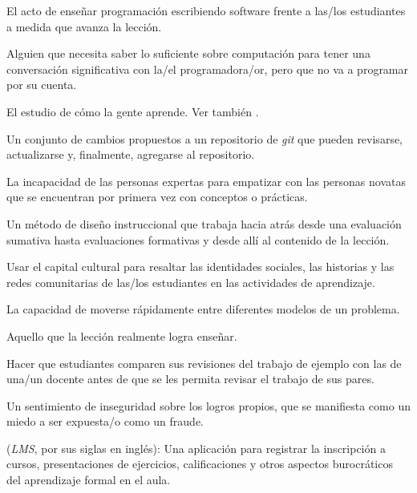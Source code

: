 \begin{description}
 El acto de enseñar programación
escribiendo software frente a las/los estudiantes a medida que avanza la lección.

 Alguien que necesita saber lo suficiente sobre 
computación para tener una conversación significativa con la/el programadora/or, pero que no va a programar por su cuenta.

 El estudio de cómo
la gente aprende. Ver también .

 Un conjunto de cambios propuestos a un repositorio de
\emph{git} que pueden revisarse, actualizarse y, finalmente, agregarse al repositorio.

 La incapacidad de las personas expertas
para empatizar con las personas novatas que se encuentran por primera
vez con conceptos o prácticas.

 Un método de diseño instruccional que
trabaja hacia atrás desde una evaluación sumativa hasta evaluaciones formativas y desde allí al contenido de la lección.

 Usar el capital cultural
para resaltar las identidades sociales, las historias y las redes comunitarias de
las/los estudiantes en las actividades de aprendizaje.

 La capacidad de moverse
rápidamente entre diferentes modelos de un problema.

 Aquello que la lección realmente logra enseñar.

 Hacer que estudiantes comparen sus
revisiones del trabajo de ejemplo con las de una/un docente antes de que
se les permita revisar el trabajo de sus pares.

 Un sentimiento de inseguridad sobre
los logros propios, que se manifiesta como un miedo a ser expuesta/o como un fraude.

 (\emph{LMS}, por sus siglas en inglés): Una aplicación para registrar 
la inscripción a cursos, presentaciones de ejercicios, calificaciones y otros aspectos burocráticos del aprendizaje formal en el aula.


\end{description}
